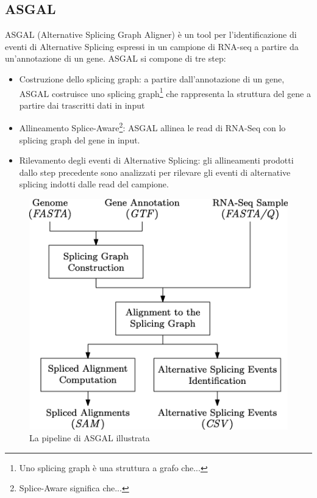 \subsection{ASGAL}
ASGAL (Alternative Splicing Graph Aligner) è un tool per l'identificazione di eventi di Alternative Splicing espressi in un campione di RNA-seq a partire
da un'annotazione di un gene. ASGAL si compone di tre step:

\begin{itemize}
	\item Costruzione dello splicing graph: a partire dall'annotazione di un gene, ASGAL costruisce uno splicing graph\footnote{Uno splicing graph è una struttura a grafo che...} che rappresenta la struttura del gene a partire dai trascritti dati in input
	\item Allineamento Splice-Aware\footnote{Splice-Aware significa che...}: ASGAL allinea le read di RNA-Seq con lo splicing graph del gene in input.
	\item Rilevamento degli eventi di Alternative Splicing: gli allineamenti prodotti dallo step precedente sono analizzati per rilevare gli eventi di alternative splicing indotti dalle read del campione.
\end{itemize}

\begin{figure}[b!]
	\includegraphics[width=\linewidth]{images/asgal.png}
  \caption{La pipeline di ASGAL illustrata}
  \label{fig:ASGAL}
\end{figure}